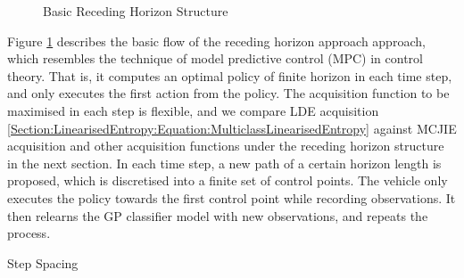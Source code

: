 		
			\begin{figure}[!htbp]
				\begin{center}
				\end{center}
			\caption{Basic Receding Horizon Structure}
			\label{Figure:Results:RecedingHorizonMethodOutline}
			\end{figure}
					
			Figure \ref{Figure:Results:RecedingHorizonMethodOutline} describes the basic flow of the receding horizon approach approach, which resembles the technique of model predictive control (MPC) in control theory. That is, it computes an optimal policy of finite horizon in each time step, and only executes the first action from the policy. The acquisition function to be maximised in each step is flexible, and we compare LDE acquisition \eqref{Section:LinearisedEntropy:Equation:MulticlassLinearisedEntropy} against MCJIE acquisition and other acquisition functions under the receding horizon structure in the next section. In each time step, a new path of a certain horizon length is proposed, which is discretised into a finite set of control points. The vehicle only executes the policy towards the first control point while recording observations. It then relearns the GP classifier model with new observations, and repeats the process. 
	
	
%			
			Step Spacing
				
